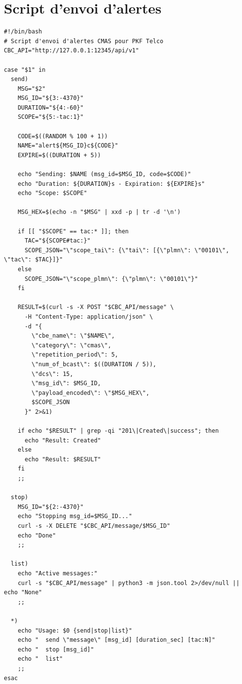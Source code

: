 \documentclass[11pt,a4paper]{article}
\begin{document}
\newpage

\section{Script d'envoi d'alertes}

\begin{filebox}
\begin{lstlisting}[style=bashstyle]
#!/bin/bash
# Script d'envoi d'alertes CMAS pour PKF Telco
CBC_API="http://127.0.0.1:12345/api/v1"

case "$1" in
  send)
    MSG="$2"
    MSG_ID="${3:-4370}"
    DURATION="${4:-60}"
    SCOPE="${5:-tac:1}"
    
    CODE=$((RANDOM % 100 + 1))
    NAME="alert${MSG_ID}c${CODE}"
    EXPIRE=$((DURATION + 5))
    
    echo "Sending: $NAME (msg_id=$MSG_ID, code=$CODE)"
    echo "Duration: ${DURATION}s - Expiration: ${EXPIRE}s"
    echo "Scope: $SCOPE"
    
    MSG_HEX=$(echo -n "$MSG" | xxd -p | tr -d '\n')
    
    if [[ "$SCOPE" == tac:* ]]; then
      TAC="${SCOPE#tac:}"
      SCOPE_JSON="\"scope_tai\": {\"tai\": [{\"plmn\": \"00101\", \"tac\": $TAC}]}"
    else
      SCOPE_JSON="\"scope_plmn\": {\"plmn\": \"00101\"}"
    fi
    
    RESULT=$(curl -s -X POST "$CBC_API/message" \
      -H "Content-Type: application/json" \
      -d "{
        \"cbe_name\": \"$NAME\",
        \"category\": \"cmas\",
        \"repetition_period\": 5,
        \"num_of_bcast\": $((DURATION / 5)),
        \"dcs\": 15,
        \"msg_id\": $MSG_ID,
        \"payload_encoded\": \"$MSG_HEX\",
        $SCOPE_JSON
      }" 2>&1)
    
    if echo "$RESULT" | grep -qi "201\|Created\|success"; then
      echo "Result: Created"
    else
      echo "Result: $RESULT"
    fi
    ;;
    
  stop)
    MSG_ID="${2:-4370}"
    echo "Stopping msg_id=$MSG_ID..."
    curl -s -X DELETE "$CBC_API/message/$MSG_ID"
    echo "Done"
    ;;
    
  list)
    echo "Active messages:"
    curl -s "$CBC_API/message" | python3 -m json.tool 2>/dev/null || echo "None"
    ;;
    
  *)
    echo "Usage: $0 {send|stop|list}"
    echo "  send \"message\" [msg_id] [duration_sec] [tac:N]"
    echo "  stop [msg_id]"
    echo "  list"
    ;;
esac
\end{lstlisting}
\end{filebox}
\end{document}
